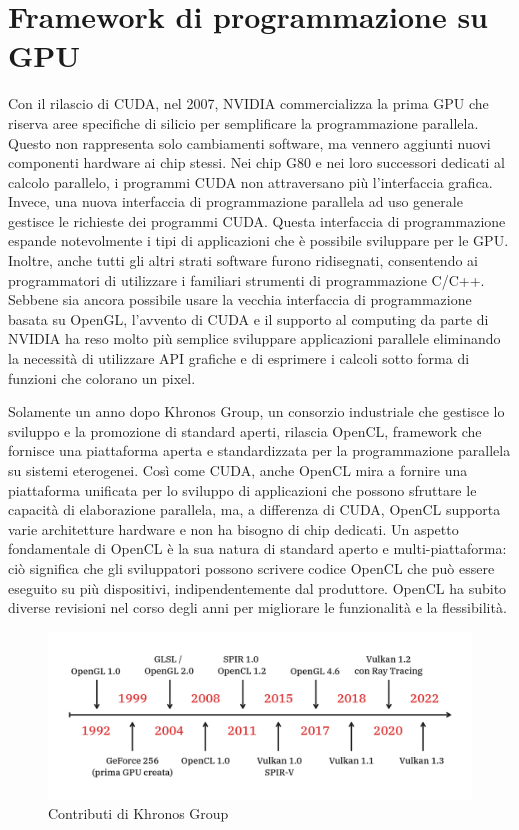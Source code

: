 \section[Framework di programmazione su GPU]{Framework di programmazione su GPU}


Con il rilascio di CUDA, nel 2007, NVIDIA commercializza la prima GPU che riserva aree specifiche di silicio per semplificare la programmazione parallela. Questo non rappresenta solo cambiamenti software, ma vennero aggiunti nuovi componenti hardware ai chip stessi. Nei chip G80 e nei loro successori dedicati al calcolo parallelo, i programmi CUDA non attraversano più l'interfaccia grafica. Invece, una nuova interfaccia di programmazione parallela ad uso generale gestisce le richieste dei programmi CUDA. Questa interfaccia di programmazione espande notevolmente i tipi di applicazioni che è possibile sviluppare per le GPU. Inoltre, anche tutti gli altri strati software furono ridisegnati, consentendo ai programmatori di utilizzare i familiari strumenti di programmazione C/C++. Sebbene sia ancora possibile usare la vecchia interfaccia di programmazione basata su OpenGL, l'avvento di CUDA e il supporto al computing da parte di NVIDIA ha reso molto più semplice sviluppare applicazioni parallele eliminando la necessità di utilizzare API grafiche e di esprimere i calcoli sotto forma di funzioni che colorano un pixel.

Solamente un anno dopo Khronos Group, un consorzio industriale che gestisce lo sviluppo e la promozione di standard aperti, rilascia OpenCL, framework che fornisce una piattaforma aperta e standardizzata per la programmazione parallela su sistemi eterogenei. Così come CUDA, anche OpenCL mira a fornire una piattaforma unificata per lo sviluppo di applicazioni che possono sfruttare le capacità di elaborazione parallela, ma, a differenza di CUDA, OpenCL supporta varie architetture hardware e non ha bisogno di chip dedicati. Un aspetto fondamentale di OpenCL è la sua natura di standard aperto e multi-piattaforma: ciò significa che gli sviluppatori possono scrivere codice OpenCL che può essere eseguito su più dispositivi, indipendentemente dal produttore. OpenCL ha subito diverse revisioni nel corso degli anni per migliorare le funzionalità e la flessibilità. 

\begin{figure}[ht]
    \centering
    \includegraphics[width=.9\linewidth]{images/chapter2/vulkan_history.png}
    \caption{Contributi di Khronos Group}
    \label{fig:vulkan_history}
\end{figure}


